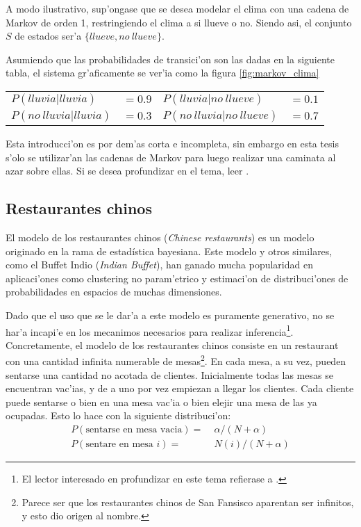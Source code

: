 A modo ilustrativo, sup'ongase que se desea modelar el clima con una cadena de Markov de orden 1, restringiendo el clima a si llueve o no. Siendo asi, el conjunto 
$S$ de estados ser'a $\{llueve, no\ llueve\}$. 

Asumiendo que las probabilidades de transici'on son las dadas en la siguiente tabla, el sistema gr'aficamente se ver'ia como la figura \ref{fig:markov_clima}

\begin{center}
\label{tabla_markov}
\begin{tabular}{l l l l}
$P(lluvia | lluvia) $ & $=0.9$ & $P(lluvia | no\ llueve) $& $=0.1$\\
$P(no\ lluvia | lluvia)  $ & $=0.3$ & $P(no\ lluvia | no\ llueve) $ & $=0.7$\\
\end{tabular}
\end{center}

\begin{imagen}
    \width{5cm}
\end{imagen}

Esta introducci'on es por dem'as corta e incompleta, sin embargo en esta tesis s'olo se utilizar'an las cadenas de Markov para luego realizar una caminata al azar sobre ellas. 
Si se desea profundizar en el tema, leer \cite{Rabiner90}.


\subsection{Restaurantes chinos}
El modelo de los restaurantes chinos (\emph{Chinese restaurants}) es un modelo originado en la rama de estad\'istica bayesiana.
Este modelo y otros similares, como el Buffet Indio (\emph{Indian Buffet}), han ganado mucha popularidad en aplicaci'ones como clustering no param'etrico 
y estimaci'on de distribuci'ones de probabilidades en espacios de muchas dimensiones.

Dado que el uso que se le dar'a a este modelo es puramente generativo, no se har'a incapi'e en los mecanimos necesarios para realizar inferencia\footnote{El lector interesado en profundizar en este tema refierase a \cite{Teh2007}.}.
Concretamente, el modelo de los restaurantes chinos consiste en un restaurant con una cantidad infinita numerable de mesas\footnote{Parece ser que los restaurantes chinos de San Fansisco aparentan ser infinitos, y esto dio origen al nombre.}. 
En cada mesa, a su vez, pueden sentarse una cantidad no acotada de clientes. Inicialmente todas las mesas se encuentran vac'ias, 
y de a uno por vez empiezan a llegar los clientes. Cada cliente puede sentarse o bien en una mesa vac'ia o bien elejir una mesa de las ya ocupadas. 
Esto lo hace con la siguiente distribuci'on:
\begin{align}
\label{eq:crp_evolution}
P(\text{sentarse en mesa vacia}) =&\; \alpha/(N + \alpha)\\
P(\text{sentare en mesa } i) =&\; N(i)/(N + \alpha)
\end{align}

